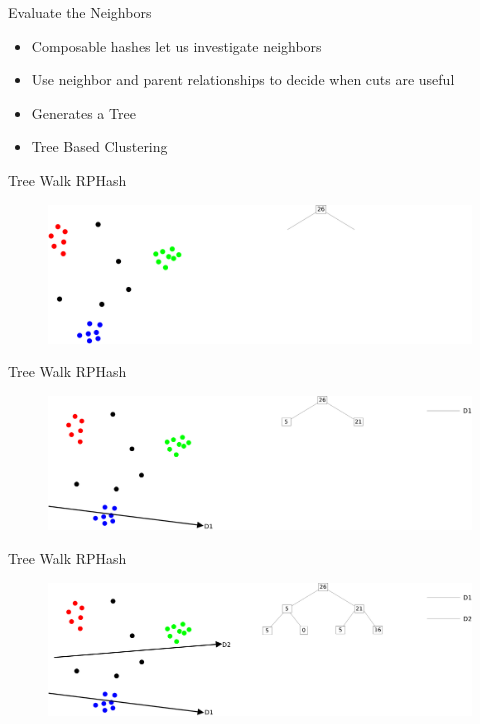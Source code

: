 \documentclass[12pt]{beamer}
\begin{document}
\begin{frame}[plain]{Evaluate the Neighbors}
\begin{itemize}
  \item Composable hashes let us investigate neighbors
  \item Use neighbor and parent relationships to decide when cuts are useful
  \item Generates a Tree
  \item Tree Based Clustering
\end{itemize}
\end{frame}


\begin{frame}[plain]{Tree Walk RPHash}
\begin{figure}
 \centerline{\includegraphics[width=.8\textwidth]{figs/cuts/split1}}
\end{figure}
\end{frame}

\begin{frame}[plain]{Tree Walk RPHash}
\begin{figure}
 \centerline{\includegraphics[width=.8\textwidth]{figs/cuts/split2}}
\end{figure}
\end{frame}

\begin{frame}[plain]{Tree Walk RPHash}
\begin{figure}
 \centerline{\includegraphics[width=.8\textwidth]{figs/cuts/split3}}
\end{figure}
\end{frame}
\end{document}
